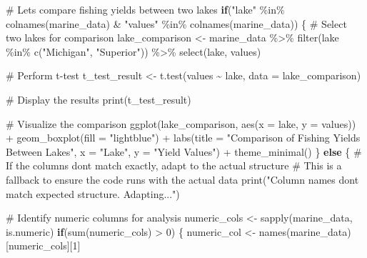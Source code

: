 \documentclass[
  letterpaper,
]{book}
\newenvironment{Shaded}{\begin{snugshade}}{\end{snugshade}}
\newcommand{\AttributeTok}[1]{\textcolor[rgb]{0.40,0.45,0.13}{#1}}
\newcommand{\CommentTok}[1]{\textcolor[rgb]{0.37,0.37,0.37}{#1}}
\newcommand{\ControlFlowTok}[1]{\textcolor[rgb]{0.00,0.23,0.31}{\textbf{#1}}}
\newcommand{\DecValTok}[1]{\textcolor[rgb]{0.68,0.00,0.00}{#1}}
\newcommand{\FunctionTok}[1]{\textcolor[rgb]{0.28,0.35,0.67}{#1}}
\newcommand{\NormalTok}[1]{\textcolor[rgb]{0.00,0.23,0.31}{#1}}
\newcommand{\OtherTok}[1]{\textcolor[rgb]{0.00,0.23,0.31}{#1}}
\newcommand{\SpecialCharTok}[1]{\textcolor[rgb]{0.37,0.37,0.37}{#1}}
\newcommand{\StringTok}[1]{\textcolor[rgb]{0.13,0.47,0.30}{#1}}
\begin{document}
\begin{Shaded}
\begin{Highlighting}[]
\CommentTok{\# Let\textquotesingle{}s compare fishing yields between two lakes}
\ControlFlowTok{if}\NormalTok{(}\StringTok{"lake"} \SpecialCharTok{\%in\%} \FunctionTok{colnames}\NormalTok{(marine\_data) }\SpecialCharTok{\&} \StringTok{"values"} \SpecialCharTok{\%in\%} \FunctionTok{colnames}\NormalTok{(marine\_data)) \{}
  \CommentTok{\# Select two lakes for comparison}
\NormalTok{  lake\_comparison }\OtherTok{\textless{}{-}}\NormalTok{ marine\_data }\SpecialCharTok{\%\textgreater{}\%}
    \FunctionTok{filter}\NormalTok{(lake }\SpecialCharTok{\%in\%} \FunctionTok{c}\NormalTok{(}\StringTok{"Michigan"}\NormalTok{, }\StringTok{"Superior"}\NormalTok{)) }\SpecialCharTok{\%\textgreater{}\%}
    \FunctionTok{select}\NormalTok{(lake, values)}
  
  \CommentTok{\# Perform t{-}test}
\NormalTok{  t\_test\_result }\OtherTok{\textless{}{-}} \FunctionTok{t.test}\NormalTok{(values }\SpecialCharTok{\textasciitilde{}}\NormalTok{ lake, }\AttributeTok{data =}\NormalTok{ lake\_comparison)}
  
  \CommentTok{\# Display the results}
  \FunctionTok{print}\NormalTok{(t\_test\_result)}
  
  \CommentTok{\# Visualize the comparison}
  \FunctionTok{ggplot}\NormalTok{(lake\_comparison, }\FunctionTok{aes}\NormalTok{(}\AttributeTok{x =}\NormalTok{ lake, }\AttributeTok{y =}\NormalTok{ values)) }\SpecialCharTok{+}
    \FunctionTok{geom\_boxplot}\NormalTok{(}\AttributeTok{fill =} \StringTok{"lightblue"}\NormalTok{) }\SpecialCharTok{+}
    \FunctionTok{labs}\NormalTok{(}\AttributeTok{title =} \StringTok{"Comparison of Fishing Yields Between Lakes"}\NormalTok{,}
         \AttributeTok{x =} \StringTok{"Lake"}\NormalTok{, }\AttributeTok{y =} \StringTok{"Yield Values"}\NormalTok{) }\SpecialCharTok{+}
    \FunctionTok{theme\_minimal}\NormalTok{()}
\NormalTok{\} }\ControlFlowTok{else}\NormalTok{ \{}
  \CommentTok{\# If the columns don\textquotesingle{}t match exactly, adapt to the actual structure}
  \CommentTok{\# This is a fallback to ensure the code runs with the actual data}
  \FunctionTok{print}\NormalTok{(}\StringTok{"Column names don\textquotesingle{}t match expected structure. Adapting..."}\NormalTok{)}
  
  \CommentTok{\# Identify numeric columns for analysis}
\NormalTok{  numeric\_cols }\OtherTok{\textless{}{-}} \FunctionTok{sapply}\NormalTok{(marine\_data, is.numeric)}
  \ControlFlowTok{if}\NormalTok{(}\FunctionTok{sum}\NormalTok{(numeric\_cols) }\SpecialCharTok{\textgreater{}} \DecValTok{0}\NormalTok{) \{}
\NormalTok{    numeric\_col }\OtherTok{\textless{}{-}} \FunctionTok{names}\NormalTok{(marine\_data)[numeric\_cols][}\DecValTok{1}\NormalTok{]}
    

\end{Highlighting}
\end{Shaded}
\end{document}
